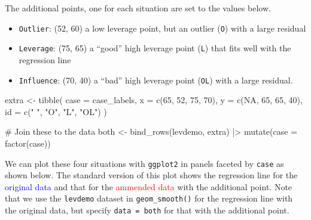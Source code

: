 \documentclass[
  letterpaper,
  10pt,
  krantz2]{krantz}
\makeatletter
\newenvironment{Shaded}{\begin{snugshade}}{\end{snugshade}}
\newcommand{\AttributeTok}[1]{\textcolor[rgb]{0.40,0.45,0.13}{#1}}
\newcommand{\CommentTok}[1]{\textcolor[rgb]{0.37,0.37,0.37}{#1}}
\newcommand{\ConstantTok}[1]{\textcolor[rgb]{0.56,0.35,0.01}{#1}}
\newcommand{\DecValTok}[1]{\textcolor[rgb]{0.68,0.00,0.00}{#1}}
\newcommand{\FunctionTok}[1]{\textcolor[rgb]{0.28,0.35,0.67}{#1}}
\newcommand{\NormalTok}[1]{\textcolor[rgb]{0.00,0.23,0.31}{#1}}
\newcommand{\OtherTok}[1]{\textcolor[rgb]{0.00,0.23,0.31}{#1}}
\newcommand{\SpecialCharTok}[1]{\textcolor[rgb]{0.37,0.37,0.37}{#1}}
\newcommand{\StringTok}[1]{\textcolor[rgb]{0.13,0.47,0.30}{#1}}
\providecommand{\tightlist}{%
  \setlength{\itemsep}{0pt}\setlength{\parskip}{0pt}}\usepackage{longtable,booktabs,array}
\newenvironment{kframe}{%
  \medskip{}
  \setlength{\fboxsep}{.8em}
  \def\at@end@of@kframe{}%
  \ifinner\ifhmode%
  \def\at@end@of@kframe{\end{minipage}}%
  \begin{minipage}{\columnwidth}%
  \fi\fi%
  \def\FrameCommand##1{\hskip\@totalleftmargin \hskip-\fboxsep
  \colorbox{shadecolor}{##1}\hskip-\fboxsep
      \hskip-\linewidth \hskip-\@totalleftmargin \hskip\columnwidth}%
  \MakeFramed {\advance\hsize-\width
    \@totalleftmargin\z@ \linewidth\hsize
    \@setminipage}}%
{\par\unskip\endMakeFramed%
  \at@end@of@kframe}
\renewenvironment{Shaded}{\begin{kframe}}{\end{kframe}}
\makeatother
\begin{document}
The additional points, one for each situation are set to the values
below.

\begin{itemize}
\tightlist
\item
  \texttt{Outlier}: (52, 60) a low leverage point, but an outlier
  (\texttt{O}) with a large residual
\item
  \texttt{Leverage}: (75, 65) a ``good'' high leverage point
  (\texttt{L}) that fits well with the regression line
\item
  \texttt{Influence}: (70, 40) a ``bad'' high leverage point
  (\texttt{OL}) with a large residual.
\end{itemize}

\begin{Shaded}
\begin{Highlighting}[]
\NormalTok{extra }\OtherTok{\textless{}{-}} \FunctionTok{tibble}\NormalTok{(}
  \AttributeTok{case =}\NormalTok{ case\_labels,}
  \AttributeTok{x  =} \FunctionTok{c}\NormalTok{(}\DecValTok{65}\NormalTok{, }\DecValTok{52}\NormalTok{, }\DecValTok{75}\NormalTok{, }\DecValTok{70}\NormalTok{),}
  \AttributeTok{y  =} \FunctionTok{c}\NormalTok{(}\ConstantTok{NA}\NormalTok{, }\DecValTok{65}\NormalTok{, }\DecValTok{65}\NormalTok{, }\DecValTok{40}\NormalTok{),}
  \AttributeTok{id =} \FunctionTok{c}\NormalTok{(}\StringTok{"  "}\NormalTok{, }\StringTok{"O"}\NormalTok{, }\StringTok{"L"}\NormalTok{, }\StringTok{"OL"}\NormalTok{)}
\NormalTok{)}

\CommentTok{\#\textquotesingle{} Join these to the data}
\NormalTok{both }\OtherTok{\textless{}{-}} \FunctionTok{bind\_rows}\NormalTok{(levdemo, extra) }\SpecialCharTok{|\textgreater{}}
  \FunctionTok{mutate}\NormalTok{(}\AttributeTok{case =} \FunctionTok{factor}\NormalTok{(case))}
\end{Highlighting}
\end{Shaded}

We can plot these four situations with \texttt{ggplot2} in panels
faceted by \texttt{case} as shown below. The standard version of this
plot shows the regression line for the \textcolor{blue}{original data}
and that for the \textcolor{red}{ammended data} with the additional
point. Note that we use the \texttt{levdemo} dataset in
\texttt{geom\_smooth()} for the regression line with the original data,
but specify \texttt{data\ =\ both} for that with the additional point.
\end{document}
